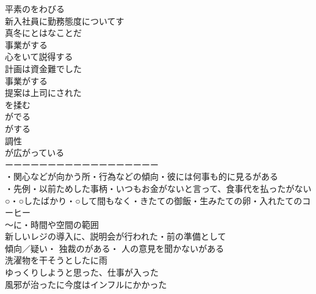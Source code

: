 平素のをわびる\\
新入社員に勤務態度についてす\\
真冬にとはなことだ\\
事業がする\\

心をいて説得する\\
計画は資金難でした\\
事業がする\\
提案は上司にされた\\

を揉む\\
がでる\\
がする\\

調性\\

が広がっている\\

ーーーーーーーーーーーーーーーーーー\\

・関心などが向かう所・行為などの傾向・彼には何事も的に見るがある\\
・先例・以前ためした事柄・いつもお金がないと言って、食事代を払ったがない\\

○・○したばかり・○して間もなく・きたての御飯・生みたての卵・入れたてのコーヒー\\

〜に・時間や空間の範囲\\
新しいレジの導入に、説明会が行われた・前の準備として\\

傾向／疑い・
独裁のがある・
人の意見を聞かないがある\\

洗濯物を干そうとしたに雨\\
ゆっくりしようと思った、仕事が入った\\
風邪が治ったに今度はインフルにかかった\\

